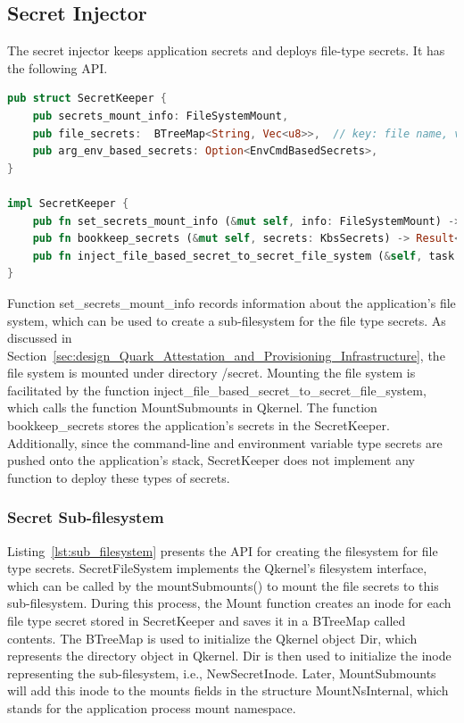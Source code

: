 \subsection{Secret Injector}
The secret injector keeps application secrets and deploys file-type secrets. It has the following API. 
\begin{lstlisting}[language=rust, caption= API for Secret Injector, label={lst:Secret_injector}]
pub struct SecretKeeper {
    pub secrets_mount_info: FileSystemMount,
    pub file_secrets:  BTreeMap<String, Vec<u8>>,  // key: file name, value: secret
    pub arg_env_based_secrets: Option<EnvCmdBasedSecrets>,
}

impl SecretKeeper {
    pub fn set_secrets_mount_info (&mut self, info: FileSystemMount) -> Result<()>
    pub fn bookkeep_secrets (&mut self, secrets: KbsSecrets) -> Result<()>
    pub fn inject_file_based_secret_to_secret_file_system (&self, task: &Task) -> Result<()>
}   
\end{lstlisting}

Function set\_secrets\_mount\_info records information about the application's file system, which can be used to create a sub-filesystem for the file type secrets. As discussed in Section~\ref{sec:design_Quark_Attestation_and_Provisioning_Infrastructure}, the file system is mounted under directory 
/secret. Mounting the file system is facilitated by the function inject\_file\_based\_secret\_to\_secret\_file\_system, which calls the function MountSubmounts in Qkernel. The function bookkeep\_secrets stores the application's secrets in the SecretKeeper. Additionally, since the command-line and environment variable type secrets are pushed onto the application's 
stack,  SecretKeeper does not implement any function to deploy these types of secrets.

\subsubsection{Secret Sub-filesystem}
Listing~\ref{lst:sub_filesystem} presents the API for creating the filesystem for file type secrets. SecretFileSystem implements the  Qkernel's filesystem interface, which can be called by the mountSubmounts() to mount the file secrets to this sub-filesystem.  During this process, 
the Mount function creates an inode for each file type secret stored in SecretKeeper and saves it in a BTreeMap called contents. The BTreeMap is used to initialize the Qkernel object Dir, which represents the directory object in Qkernel. Dir is then used to initialize the inode 
representing the sub-filesystem, i.e., NewSecretInode. Later, MountSubmounts will add this inode to the mounts fields in the structure MountNsInternal, which stands for the application process mount namespace.

